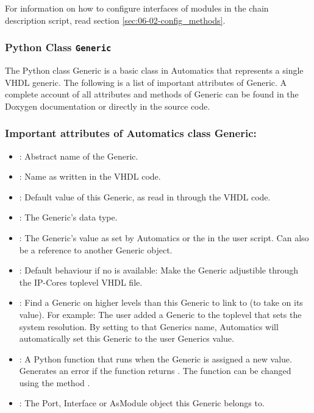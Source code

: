 For information on how to configure interfaces of modules in the chain description script, read section \ref{sec:06-02-config_methods}.


\subsubsection{Python Class \texttt{Generic}}

The Python class Generic is a basic class in Automatics that represents a single VHDL generic.
The following is a list of important attributes of Generic.
A complete account of all attributes and methods of Generic can be found in the Doxygen documentation or directly in the source code.

\subsubsection*{Important attributes of Automatics class Generic:}

\begin{itemize}
\item {}: Abstract name of the Generic.
\item {}: Name as written in the VHDL code.
\item {}: Default value of this Generic, as read in through the VHDL code.
\item {}: The Generic's data type.
\item {}: The Generic's value as set by Automatics or the in the user script. Can also be a reference to another Generic object.
\item {}: Default behaviour if no  is available: Make the Generic adjustible through the IP-Cores toplevel VHDL file.
\item {}: Find a Generic on higher levels than this Generic to link to (to take on its value). For example: The user added a Generic to the toplevel that sets the system resolution. By setting  to that Generics name, Automatics will automatically set this Generic to the user Generics value.
\item {}: A Python function that runs when the Generic is assigned a new value. Generates an error if the function returns . The function can be changed using the method .
\item {}: The Port, Interface or AsModule object this Generic belongs to.
\end{itemize}

